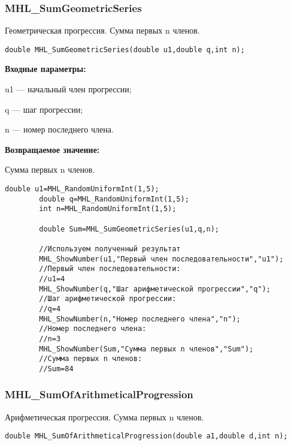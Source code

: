 \documentclass[a4paper,12pt]{article}
\begin{document}
\subsubsection{MHL\_SumGeometricSeries}\label{MHL_SumGeometricSeries}

Геометрическая прогрессия. Сумма первых n членов.


\begin{lstlisting}[label=code_syntax_MHL_SumGeometricSeries,caption=Синтаксис]
double MHL_SumGeometricSeries(double u1,double q,int n);
\end{lstlisting}

\textbf{Входные параметры:}  
 
u1 --- начальный член прогрессии;
 
q --- шаг  прогрессии;
 
n --- номер последнего члена.

\textbf{Возвращаемое значение:}
 
Сумма первых n членов.


\begin{lstlisting}[label=code_use_MHL_SumGeometricSeries,caption=Пример использования]
        double u1=MHL_RandomUniformInt(1,5);
        double q=MHL_RandomUniformInt(1,5);
        int n=MHL_RandomUniformInt(1,5);

        double Sum=MHL_SumGeometricSeries(u1,q,n);

        //Используем полученный результат
        MHL_ShowNumber(u1,"Первый член последовательности","u1");
        //Первый член последовательности:
        //u1=4
        MHL_ShowNumber(q,"Шаг арифметической прогрессии","q");
        //Шаг арифметической прогрессии:
        //q=4
        MHL_ShowNumber(n,"Номер последнего члена","n");
        //Номер последнего члена:
        //n=3
        MHL_ShowNumber(Sum,"Сумма первых n членов","Sum");
        //Сумма первых n членов:
        //Sum=84
\end{lstlisting}

\subsubsection{MHL\_SumOfArithmeticalProgression}\label{MHL_SumOfArithmeticalProgression}

Арифметическая прогрессия. Сумма первых n членов.


\begin{lstlisting}[label=code_syntax_MHL_SumOfArithmeticalProgression,caption=Синтаксис]
double MHL_SumOfArithmeticalProgression(double a1,double d,int n);
\end{lstlisting}
\end{document}
